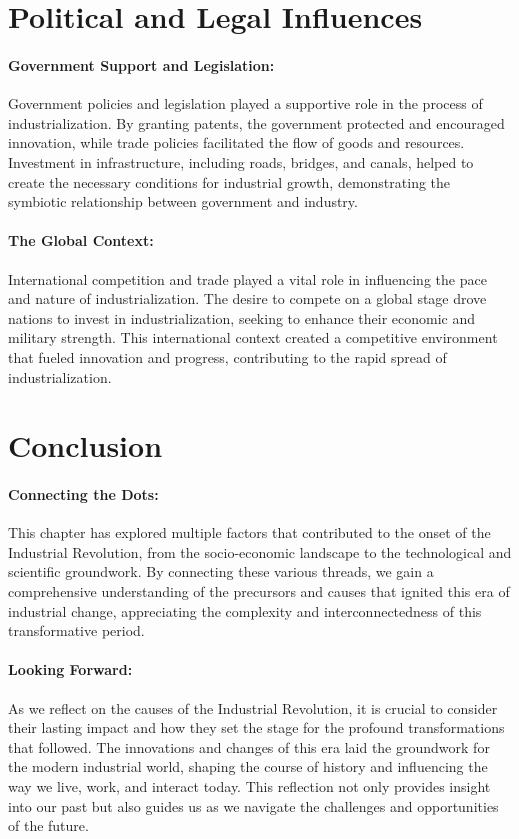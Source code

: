 \documentclass[a4paper,12pt]{book}
\begin{document}
\section*{Political and Legal Influences}

\paragraph{Government Support and Legislation:}
Government policies and legislation played a supportive role in the process of industrialization. By granting patents, the government protected and encouraged innovation, while trade policies facilitated the flow of goods and resources. Investment in infrastructure, including roads, bridges, and canals, helped to create the necessary conditions for industrial growth, demonstrating the symbiotic relationship between government and industry.

\paragraph{The Global Context:}
International competition and trade played a vital role in influencing the pace and nature of industrialization. The desire to compete on a global stage drove nations to invest in industrialization, seeking to enhance their economic and military strength. This international context created a competitive environment that fueled innovation and progress, contributing to the rapid spread of industrialization.

\section*{Conclusion}

\paragraph{Connecting the Dots:}
This chapter has explored multiple factors that contributed to the onset of the Industrial Revolution, from the socio-economic landscape to the technological and scientific groundwork. By connecting these various threads, we gain a comprehensive understanding of the precursors and causes that ignited this era of industrial change, appreciating the complexity and interconnectedness of this transformative period.

\paragraph{Looking Forward:}
As we reflect on the causes of the Industrial Revolution, it is crucial to consider their lasting impact and how they set the stage for the profound transformations that followed. The innovations and changes of this era laid the groundwork for the modern industrial world, shaping the course of history and influencing the way we live, work, and interact today. This reflection not only provides insight into our past but also guides us as we navigate the challenges and opportunities of the future.
\end{document}

